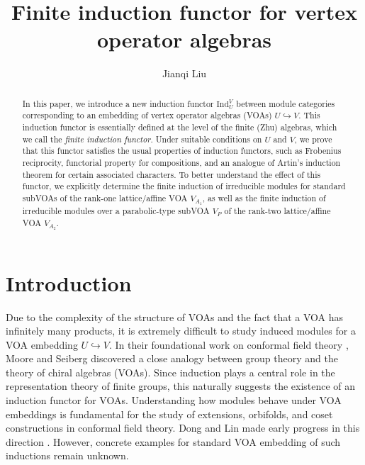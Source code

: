 \documentclass[12pt,a4paper,reqno]{amsart}
\numberwithin{equation}{section}
\numberwithin{equation}{section}
\theoremstyle{definition}
\def\Ind{\mathrm{Ind}}
\def\Ind{\mathrm{Ind}}
\begin{document}
\title{Finite induction functor for vertex operator algebras}
\author{Jianqi Liu}
\address{Department of Mathematics, University of Pennsylvania, Philadelphia, PA, 19104}
\maketitle

\begin{abstract}
In this paper, we introduce a new induction functor $\Ind^V_U$ between module categories corresponding to an embedding of vertex operator algebras (VOAs) $U \hookrightarrow V$. This induction functor is essentially defined at the level of the finite (Zhu) algebras, which we call the \emph{finite induction functor}. Under suitable conditions on $U$ and $V$, we prove that this functor satisfies the usual properties of induction functors, such as Frobenius reciprocity, functorial property for compositions, and an analogue of Artin’s induction theorem for certain associated characters. To better understand the effect of this functor, we explicitly determine the finite induction of irreducible modules for standard subVOAs of the rank-one lattice/affine VOA $V_{A_1}$, as well as the finite induction of irreducible modules over a parabolic-type subVOA $V_P$ of the rank-two lattice/affine VOA $V_{A_2}$.

\end{abstract}

\tableofcontents

\allowdisplaybreaks



\section{Introduction}




	Due to the complexity of the structure of VOAs and the fact that a VOA has infinitely many products, it is extremely difficult to study induced modules for a VOA embedding $U \hookrightarrow V$. In their foundational work on conformal field theory \cite{MS89}, Moore and Seiberg discovered a close analogy between group theory and the theory of chiral algebras (VOAs). Since induction plays a central role in the representation theory of finite groups, this naturally suggests the existence of an induction functor for VOAs. Understanding how modules behave under VOA embeddings is fundamental for the study of extensions, orbifolds, and coset constructions in conformal field theory. Dong and Lin made early progress in this direction \cite{DLin96}. 
	However, concrete examples for standard VOA embedding of such inductions remain unknown. 
	
\end{document}
